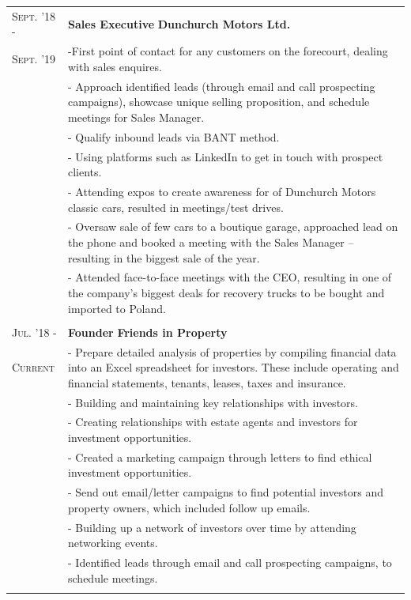 \documentclass[a4paper,10pt]{extarticle} %
\begin{document}
{\begin{tabularx}{\linewidth}{ l | X }
\textsc{Sept. '18 -} & \textbf{Sales Executive} \hfill\textbf{Dunchurch Motors Ltd.}\\
\textsc{Sept. '19 } & {-First point of contact for any customers on the forecourt, dealing with sales enquires. }\\
& {- Approach identified leads (through email and call prospecting campaigns), showcase unique selling proposition, and schedule meetings for Sales Manager. }\\
& {- Qualify inbound leads via BANT method. }\\
& {- Using platforms such as LinkedIn to get in touch with prospect clients. }\\
& {- Attending expos to create awareness for of Dunchurch Motors classic cars, resulted in meetings/test drives. }\\
& {- Oversaw sale of few cars to a boutique garage, approached lead on the phone and booked a meeting with the Sales Manager – resulting in the biggest sale of the year. }\\
& {- Attended face-to-face meetings with the CEO, resulting in one of the company’s biggest deals for recovery trucks to be bought and imported to Poland. }\\
\multicolumn{1}{c}{} \\



\textsc{Jul. '18 -} & \textbf{Founder} \hfill\textbf{Friends in Property}\\
\textsc{Current} & {- Prepare detailed analysis of properties by compiling financial data into an Excel spreadsheet for
investors. These include operating and financial statements, tenants, leases, taxes and insurance. }\\
& {- Building and maintaining key relationships with investors. }\\
& {- Creating relationships with estate agents and investors for investment opportunities. }\\
& {- Created a marketing campaign through letters to find ethical investment opportunities. }\\
& {- Send out email/letter campaigns to find potential investors and property owners, which included follow up emails. }\\
& {- Building up a network of investors over time by attending networking events. }\\
& {- Identified leads through email and call prospecting campaigns, to schedule meetings. }\\
\multicolumn{1}{c}{} \\



\end{tabularx}}
\end{document}
